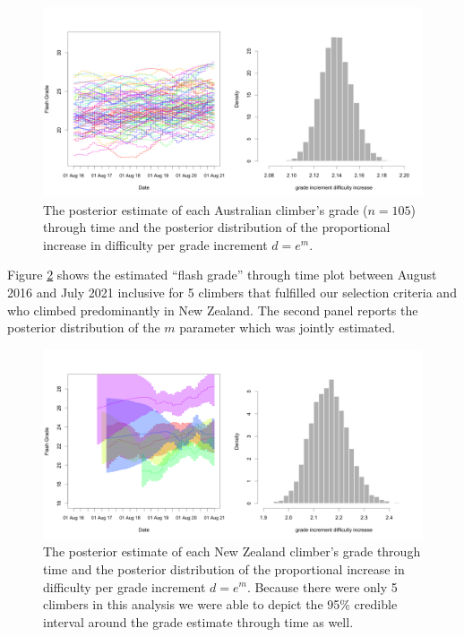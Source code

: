 \documentclass[11pt]{article}
\begin{document}
\begin{figure}
\centering
\includegraphics[width=\textwidth]{../results/aus/ascents-from-2016-08-01-to-2021-08-01-minAscents400-minFails1-posterior.png}
\caption{\small The posterior estimate of each Australian climber's grade ($n=105$) through time and the posterior distribution of the proportional increase in difficulty per grade increment $d = e^m$.}
\label{aus_ascents_by_attempt}
\end{figure}

Figure \ref{nz_ascents_by_attempt} shows the estimated ``flash grade'' through time plot between August 2016 and July 2021 inclusive for 5 climbers that fulfilled our selection criteria and who climbed predominantly in New Zealand. The second panel reports the posterior distribution of the $m$ parameter which was jointly estimated.


\begin{figure}
\centering
\includegraphics[width=\textwidth]{../results/nz/ascents-from-2016-08-01-to-2021-08-01-minAscents400-minFails1-posterior.png}
\caption{\small The posterior estimate of each New Zealand climber's grade through time and the posterior distribution of the proportional increase in difficulty per grade increment $d = e^m$. Because there were only 5 climbers in this analysis we were able to depict the 95\% credible interval around the grade estimate through time as well.}
\label{nz_ascents_by_attempt}
\end{figure}
\end{document}
